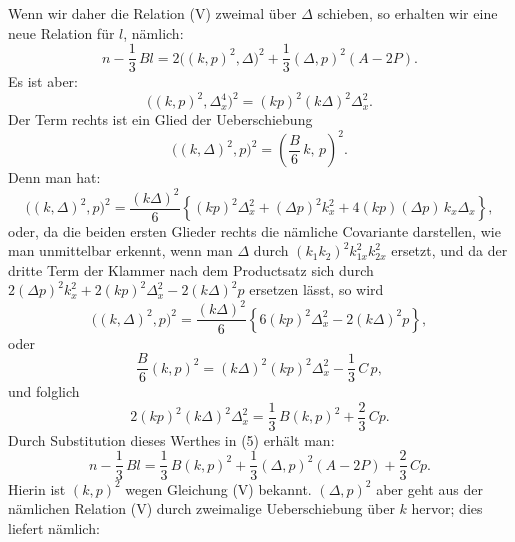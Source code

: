 \documentclass[11pt]{article}
\providecommand{\weq}[2]{\begin{equation}\tag{#1}#2\end{equation}}
\let\Delta\varDelta
\begin{document}
Wenn wir daher die Relation (V) zweimal über $\Delta$ schieben, so erhalten wir eine neue Relation für $l$, nämlich:
\weq{5}{
n - \frac{1}{3}\,Bl = 2\big((k,p)^2,\Delta\big)^2 + \frac{1}{3}(\Delta,p)^2(A-2P).
}
Es ist aber:
\[
\big((k,p)^2,\Delta_x^4\big)^2 = (kp)^2(k\Delta)^2\Delta_x^2.
\]
Der Term rechts ist ein Glied der Ueberschiebung
\[
\big((k,\Delta)^2,p\big)^2 = \left(\frac{B}{6}\,k,\,p\right)^2.
\]
Denn man hat:
\[
\big((k,\Delta)^2,p\big)^2 = \frac{(k\Delta)^2}{6}\left\{ (kp)^2\Delta_x^2 + (\Delta p)^2 k_x^2 + 4(kp)(\Delta p)\,k_x\Delta_x \right\},
\]
oder, da die beiden ersten Glieder rechts die nämliche Covariante darstellen, wie man unmittelbar erkennt, wenn man $\Delta$ durch $(k_1 k_2)^2 k_{1x}^2 k_{2x}^2$ ersetzt, und da der dritte Term der Klammer nach dem Productsatz sich durch $2(\Delta p)^2 k_x^2 + 2(kp)^2\Delta_x^2 - 2(k\Delta)^2 p$ ersetzen lässt, so wird
\[
\big((k,\Delta)^2,p\big)^2 = \frac{(k\Delta)^2}{6}\left\{ 6(kp)^2\Delta_x^2 - 2(k\Delta)^2 p \right\},
\]
oder
\[
\frac{B}{6}(k,p)^2 = (k\Delta)^2(kp)^2\Delta_x^2 - \frac{1}{3}\,C\,p,
\]
und folglich
\[
2(kp)^2(k\Delta)^2\Delta_x^2 = \frac{1}{3}\,B(k,p)^2 + \frac{2}{3}\,Cp.
\]
Durch Substitution dieses Werthes in (5) erhält man:
\weq{6}{
n - \frac{1}{3}\,Bl = \frac{1}{3}\,B(k,p)^2 + \frac{1}{3}(\Delta,p)^2(A-2P) + \frac{2}{3}\,Cp.
}
Hierin ist $(k,p)^2$ wegen Gleichung (V) bekannt. $(\Delta,p)^2$ aber geht aus der nämlichen Relation (V) durch zweimalige Ueberschiebung über $k$ hervor; dies liefert nämlich:
\end{document}
